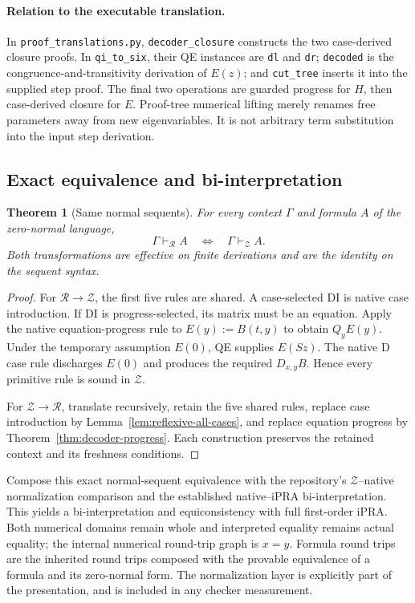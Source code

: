 \documentclass[11pt,a4paper]{article}
\newtheorem{theorem}{Theorem}[section]
\theoremstyle{definition}
\begin{document}
\paragraph{Relation to the executable translation.}
In \texttt{proof\_translations.py}, \texttt{decoder\_closure} constructs
the two case-derived closure proofs.  In \texttt{qi\_to\_six}, their QE
instances are \texttt{dl} and \texttt{dr}; \texttt{decoded} is the
congruence-and-transitivity derivation of $E(z)$; and \texttt{cut\_tree}
inserts it into the supplied step proof.  The final two operations are
guarded progress for $H$, then case-derived closure for $E$.
Proof-tree numerical lifting merely renames free parameters away from
new eigenvariables.  It is not arbitrary term substitution into the
input step derivation.


\subsection{Exact equivalence and bi-interpretation}

\begin{theorem}[Same normal sequents]
For every context $\Gamma$ and formula $A$ of the zero-normal language,
\[
 \Gamma\vdash_{\mathcal R}A
 \quad\Longleftrightarrow\quad
 \Gamma\vdash_{\mathcal Z}A.
\]
Both transformations are effective on finite derivations and are the
identity on the sequent syntax.
\end{theorem}
\begin{proof}
For $\mathcal R\to\mathcal Z$, the first five rules are shared.
A case-selected DI is native case introduction.  If DI is
progress-selected, its matrix must be an equation.  Apply the native
equation-progress rule to $E(y):=B(t,y)$ to obtain $Q_yE(y)$.
Under the temporary assumption $E(0)$, QE supplies $E(Sz)$.
The native D case rule discharges $E(0)$ and produces the required
$D_{x,y}B$.  Hence every primitive rule is sound in $\mathcal Z$.

For $\mathcal Z\to\mathcal R$, translate recursively, retain the
five shared rules, replace case introduction by
Lemma~\ref{lem:reflexive-all-cases}, and replace equation progress by
Theorem~\ref{thm:decoder-progress}.  Each construction preserves the
retained context and its freshness conditions.
\end{proof}

Compose this exact normal-sequent equivalence with the repository's
$\mathcal Z$--native normalization comparison and the established
native--iPRA bi-interpretation.  This yields a bi-interpretation and
equiconsistency with full first-order iPRA.  Both numerical domains
remain whole and interpreted equality remains actual equality; the
internal numerical round-trip graph is $x=y$.  Formula round trips are
the inherited round trips composed with the provable equivalence of a
formula and its zero-normal form.  The normalization layer is explicitly
part of the presentation, and is included in any checker measurement.
\end{document}
